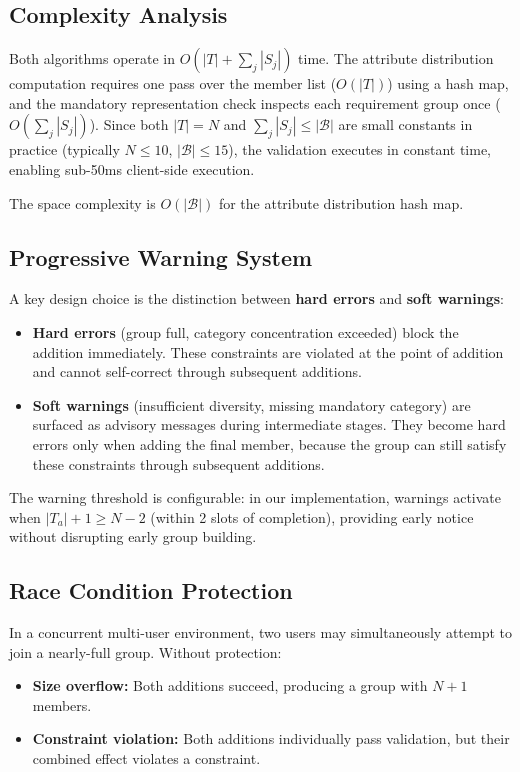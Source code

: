 \documentclass[11pt,a4paper]{article}
\theoremstyle{plain}
\theoremstyle{definition}
\theoremstyle{remark}
\begin{document}
\subsection{Complexity Analysis}

Both algorithms operate in $O(|T| + \sum_j |S_j|)$ time. The attribute distribution computation requires one pass over the member list ($O(|T|)$) using a hash map, and the mandatory representation check inspects each requirement group once ($O(\sum_j |S_j|)$). Since both $|T| = N$ and $\sum_j |S_j| \leq |\mathcal{B}|$ are small constants in practice (typically $N \leq 10$, $|\mathcal{B}| \leq 15$), the validation executes in constant time, enabling sub-50ms client-side execution.

The space complexity is $O(|\mathcal{B}|)$ for the attribute distribution hash map.

\subsection{Progressive Warning System}

A key design choice is the distinction between \textbf{hard errors} and \textbf{soft warnings}:
\begin{itemize}[noitemsep,topsep=4pt]
    \item \textbf{Hard errors} (group full, category concentration exceeded) block the addition immediately. These constraints are violated at the point of addition and cannot self-correct through subsequent additions.
    \item \textbf{Soft warnings} (insufficient diversity, missing mandatory category) are surfaced as advisory messages during intermediate stages. They become hard errors only when adding the final member, because the group can still satisfy these constraints through subsequent additions.
\end{itemize}

The warning threshold is configurable: in our implementation, warnings activate when $|T_a| + 1 \geq N - 2$ (within 2 slots of completion), providing early notice without disrupting early group building.

\subsection{Race Condition Protection}

In a concurrent multi-user environment, two users may simultaneously attempt to join a nearly-full group. Without protection:
\begin{itemize}[noitemsep,topsep=3pt]
    \item \textbf{Size overflow:} Both additions succeed, producing a group with $N+1$ members.
    \item \textbf{Constraint violation:} Both additions individually pass validation, but their combined effect violates a constraint.
\end{itemize}
\end{document}
